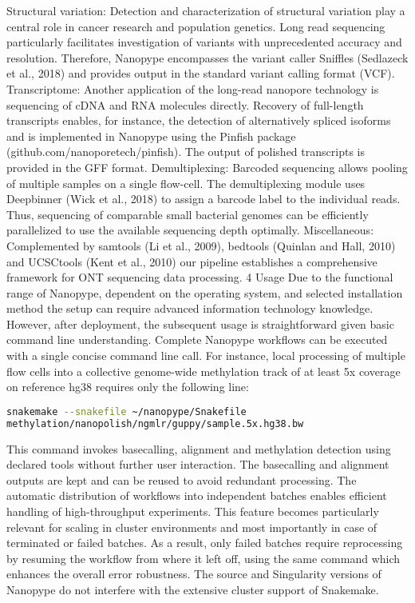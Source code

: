 Structural variation: Detection and characterization of structural variation play a central role in cancer research and population genetics. Long read sequencing particularly facilitates investigation of variants with unprecedented accuracy and resolution. Therefore, Nanopype encompasses the variant caller Sniffles (Sedlazeck et al., 2018) and provides output in the standard variant calling format (VCF).
Transcriptome: Another application of the long-read nanopore technology is sequencing of cDNA and RNA molecules directly. Recovery of full-length transcripts enables, for instance, the detection of alternatively spliced isoforms and is implemented in Nanopype using the Pinfish package (github.com/nanoporetech/pinfish). The output of polished transcripts is provided in the GFF format.
Demultiplexing: Barcoded sequencing allows pooling of multiple samples on a single flow-cell. The demultiplexing module uses Deepbinner (Wick et al., 2018) to assign a barcode label to the individual reads. Thus, sequencing of comparable small bacterial genomes can be efficiently parallelized to use the available sequencing depth optimally.
Miscellaneous: Complemented by samtools (Li et al., 2009), bedtools (Quinlan and Hall, 2010) and UCSCtools (Kent et al., 2010) our pipeline establishes a comprehensive framework for ONT sequencing data processing.
4	Usage
Due to the functional range of Nanopype, dependent on the operating system, and selected installation method the setup can require advanced information technology knowledge. However, after deployment, the subsequent usage is straightforward given basic command line understanding. Complete Nanopype workflows can be executed with a single concise command line call. For instance, local processing of multiple flow cells into a collective genome-wide methylation track of at least 5x coverage on reference hg38 requires only the following line:

\begin{lstlisting}[language=sh, caption=Snakemake example]
snakemake --snakefile ~/nanopype/Snakefile 
methylation/nanopolish/ngmlr/guppy/sample.5x.hg38.bw
\end{lstlisting}

This command invokes basecalling, alignment and methylation detection using declared tools without further user interaction. The basecalling and alignment outputs are kept and can be reused to avoid redundant processing.
The automatic distribution of workflows into independent batches enables efficient handling of high-throughput experiments. This feature becomes particularly relevant for scaling in cluster environments and most importantly in case of terminated or failed batches. As a result, only failed batches require reprocessing by resuming the workflow from where it left off, using the same command which enhances the overall error robustness.
The source and Singularity versions of Nanopype do not interfere with the extensive cluster support of Snakemake.

